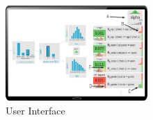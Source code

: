 \begin{figure}
\centering
\includegraphics[width=0.48\textwidth]{figures/ui.pdf}
\caption{User Interface}
\label{fig:ui}	
\end{figure}

